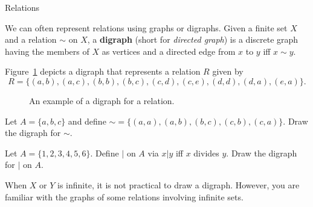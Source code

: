 \begin{section}{Relations}
\begin{remark}
We can often represent relations using graphs or digraphs.  Given a finite set $X$ and a relation $\sim$ on $X$, a \textbf{digraph} (short for \emph{directed graph}) is a discrete graph having the members of $X$ as vertices and a directed edge from $x$ to $y$ iff $x\sim y$.
\end{remark}

\begin{example}
Figure~\ref{fig:digraph} depicts a digraph that represents a relation $R$ given by
\[
R=\{(a,b),(a,c),(b,b),(b,c),(c,d),(c,e),(d,d),(d,a),(e,a)\}.
\]

\begin{figure}[h]
\begin{center}
\caption{An example of a digraph for a relation.}\label{fig:digraph}
\end{center}
\end{figure}

\end{example}

\begin{exercise}
Let $A=\{a,b,c\}$ and define $\sim=\{(a,a),(a,b),(b,c),(c,b),(c,a)\}$.  Draw the digraph for $\sim$.
\end{exercise}

\begin{exercise}
Let $A=\{1,2,3,4,5,6\}$.  Define $|$ on $A$ via $x|y$ iff $x$ divides $y$.  Draw the digraph for $|$ on $A$.
\end{exercise}

When $X$ or $Y$ is infinite, it is not practical to draw a digraph.  However, you are familiar with the graphs of some relations involving infinite sets.


\end{section}
